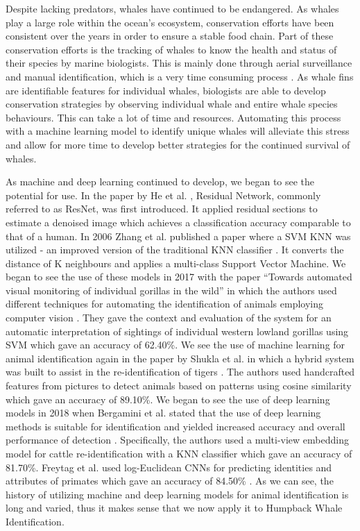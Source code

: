 \documentclass[paper=a4, fontsize=11pt]{scrartcl}
\numberwithin{equation}{section}		%
\numberwithin{table}{section}				%
\begin{document}
Despite lacking predators, whales have continued to be endangered. As whales play a large role within the ocean's ecosystem, conservation efforts have been consistent over the years in order to ensure a stable food chain. Part of these conservation efforts is the tracking of whales to know the health and status of their species by marine biologists. This is mainly done through aerial surveillance and manual identification, which is a very time consuming process \cite{JaisakthiS.M.2017Awms}. As whale fins are identifiable features for individual whales, biologists are able to develop conservation strategies by observing individual whale and entire whale species behaviours. This can take a lot of time and resources. Automating this process with a machine learning model to identify unique whales will alleviate this stress and allow for more time to develop better strategies for the continued survival of whales.

As machine and deep learning continued to develop, we began to see the potential for use. In the paper by He et al. \cite{he2016deep}, Residual Network, commonly referred to as ResNet, was first introduced. It applied residual sections to estimate a denoised image which achieves a classification accuracy comparable to that of a human. In 2006 Zhang et al. published a paper where a SVM KNN was utilized - an improved version of the traditional KNN classifier \cite{zhang2006svm}. It converts the distance of K neighbours and applies a multi-class Support Vector Machine. We began to see the use of these models in 2017 with the paper “Towards automated visual monitoring of individual gorillas in the wild” in which the authors used different techniques for automating the identification of animals employing computer vision \cite{brust2017towards}. They gave the context and evaluation of the system for an automatic interpretation of sightings of individual western lowland gorillas using SVM which gave an accuracy of 62.40\%. We see the use of machine learning for animal identification again in the paper by Shukla et al. in which a hybrid system was built to assist in the re-identification of tigers \cite{shukla2019hybrid}. The authors used handcrafted features from pictures to detect animals based on patterns using cosine similarity which gave an accuracy of 89.10\%. We began to see the use of deep learning models in 2018 when Bergamini et al.  stated that the use of deep learning methods is suitable for identification and yielded increased accuracy and overall performance of detection \cite{bergamini2018multi}. Specifically, the authors used a multi-view embedding model for cattle re-identification with a KNN classifier which gave an accuracy of 81.70\%. Freytag et al. used log-Euclidean CNNs for predicting identities and attributes of primates which gave an accuracy of 84.50\%  \cite{freytag2016chimpanzee}. As we can see, the history of utilizing machine and deep learning models for animal identification is long and varied, thus it makes sense that we now apply it to Humpback Whale Identification.
\end{document}
